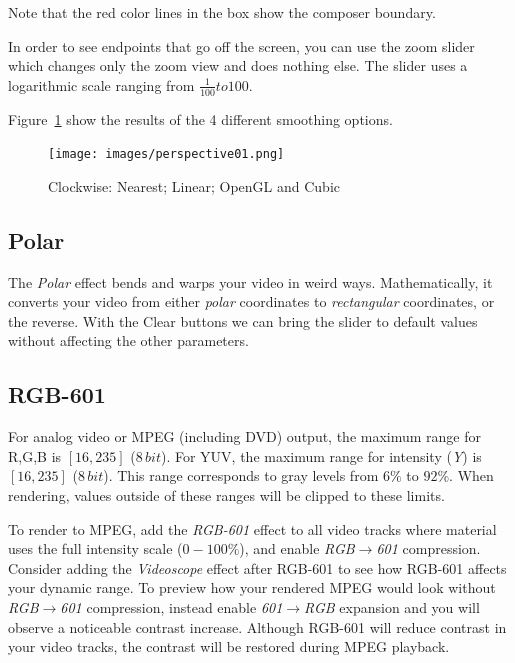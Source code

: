 Note that the red color lines in the box show the composer boundary.

In order to see endpoints that go off the screen, you can use the zoom slider which changes only the zoom view and does nothing else. The slider uses a logarithmic scale ranging from $\frac{1}{100} to 100$. 

Figure~\ref{fig:perspective01} show the results of the 4 different smoothing options.

\begin{figure}[hbtp]
    \centering
    \texttt{[image: images/perspective01.png]}
    \caption{Clockwise: Nearest; Linear; OpenGL and Cubic}
    \label{fig:perspective01}
\end{figure}

\subsection{Polar}%
\label{sub:polar}

The \textit{Polar} effect bends and warps your video in weird ways. Mathematically, it converts your video from either \textit{polar} coordinates to \textit{rectangular} coordinates, or the reverse. With the Clear buttons we can bring the slider to default values without affecting the other parameters.

\subsection{RGB-601}%
\label{sub:rgb-601}

For analog video or MPEG (including DVD) output, the maximum range for R,G,B is $[16,235]$ ($8\,bit$). For YUV, the maximum range for intensity (\textit{Y}) is $[16, 235]$ ($8\,bit$). This range corresponds to gray levels from $6\%$ to $92\%$. When rendering, values outside of these ranges will be clipped to these limits.

To render to MPEG, add the \textit{RGB-601} effect to all video tracks where material uses the full intensity scale ($0-100\%$), and enable \textit{RGB$\rightarrow$601} compression. Consider adding the \textit{Videoscope} effect after RGB-601 to see how RGB-601 affects your dynamic range. To preview how your rendered MPEG would look without \textit{RGB$\rightarrow$601} compression, instead enable \textit{601$\rightarrow$RGB} expansion and you will observe a noticeable contrast increase. Although RGB-601 will reduce contrast in your video tracks, the contrast will be restored during MPEG playback.

